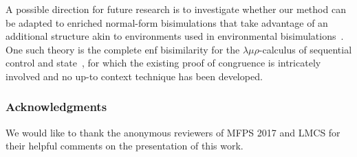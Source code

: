 \documentclass{lmcs}
\theoremstyle{defC}
\begin{document}
A possible direction for future research is to investigate whether our
method can be adapted to enriched normal-form bisimulations that take
advantage of an additional structure akin to environments used in
environmental bisimulations~\cite{Sangiorgi-al:TOPLAS11}. One such
theory is the complete enf bisimilarity for the
$\lambda\mu\rho$-calculus of sequential control and
state~\cite{Stoevring-Lassen:POPL07}, for which the existing proof of
congruence is intricately involved and no up-to context technique has
been developed.

\subsubsection*{Acknowledgments} We would like to thank the anonymous
reviewers of MFPS 2017 and LMCS for their helpful comments on the
presentation of this work.



\end{document}
